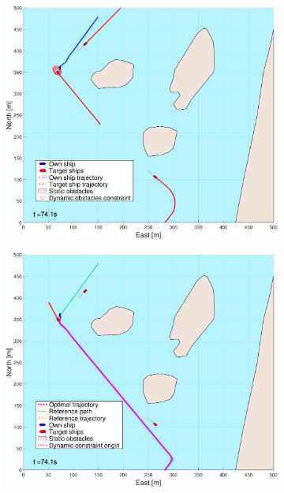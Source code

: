 \begin{figure}[!ht]
\begin{subfigure}[b]{0.494\textwidth}
        \subcaption{}
    \end{subfigure}
    \hfill
    \\
    \begin{subfigure}[b]{0.494\textwidth}
        \centering
        \includegraphics[width=\textwidth]{Images/NewFigures/Helloya_Rev/_Simple_1fig1_time=75}
        \subcaption{}
    \end{subfigure}
    \hfill
    \begin{subfigure}[b]{0.494\textwidth}
        \centering
        \includegraphics[width=\textwidth]{Images/NewFigures/Helloya_Rev/_Simple_1fig999_time=75}

\end{subfigure}
\end{figure}
